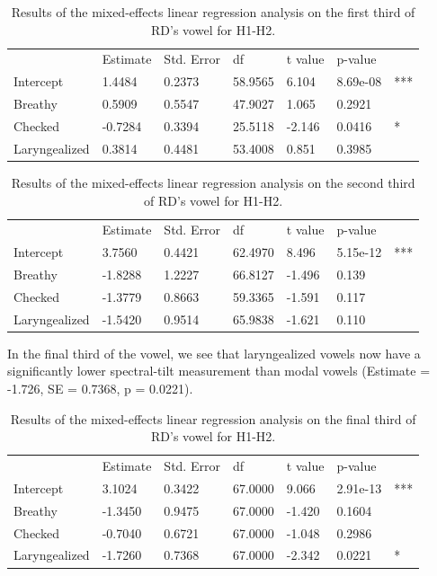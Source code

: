 \documentclass[12pt, letterpaper]{article}
\providecommand{\lsptoprule}{\midrule\toprule}
\providecommand{\lspbottomrule}{\bottomrule\midrule}
\begin{document}
\begin{table}[!h]
    \centering
    \caption{Results of the mixed-effects linear regression analysis on the first third of RD's  vowel for H1-H2. }
    \label{tab:RD_H1H2_First}
    \begin{tabular}{lllllll}
	\lsptoprule
					&  Estimate  & Std. Error & df & t value & p-value & \\
        Intercept       &  1.4484 & 0.2373 & 58.9565 & 6.104 & 8.69e-08 & ***\\  
  	Breathy   		&  0.5909 & 0.5547 & 47.9027 & 1.065 & 0.2921 & \\
	Checked    		& -0.7284 & 0.3394 & 25.5118 & -2.146 & 0.0416 & * \\
	Laryngealized	&  0.3814 & 0.4481 & 53.4008 &  0.851 &  0.3985 & \\
        \lspbottomrule
    \end{tabular}
\end{table}

\begin{table}[!h]
    \centering
    \caption{Results of the mixed-effects linear regression analysis on the second third of RD's vowel for H1-H2. }
    \label{tab:RD_H1H2_Second}
    \begin{tabular}{lllllll}
	\lsptoprule
					&  Estimate  & Std. Error & df & t value & p-value & \\
        Intercept       &  3.7560  & 0.4421 & 62.4970 & 8.496 & 5.15e-12 & *** \\ 
  	Breathy   		&  -1.8288 & 1.2227 & 66.8127 & -1.496 & 0.139 &  \\
	Checked    		&  -1.3779 & 0.8663 & 59.3365 & -1.591 & 0.117  & \\
	Laryngealized	&  -1.5420 & 0.9514 & 65.9838 & -1.621 & 0.110 & \\
        \lspbottomrule
    \end{tabular}
\end{table}

In the final third of the vowel, we see that laryngealized vowels now have a significantly lower spectral-tilt measurement than modal vowels (Estimate = -1.726, SE = 0.7368, p = 0.0221).

\begin{table}[!h]
    \centering
    \caption{Results of the mixed-effects linear regression analysis on the final third of RD's vowel for H1-H2. }
    \label{tab:RD_H1H2_Third}
    \begin{tabular}{lllllll}
	\lsptoprule
					&  Estimate  & Std. Error & df & t value & p-value & \\
        Intercept       &  3.1024 & 0.3422 & 67.0000 & 9.066 & 2.91e-13 & *** \\  
  	Breathy   		& -1.3450 & 0.9475 & 67.0000 & -1.420 & 0.1604 &\\
	Checked    		& -0.7040 & 0.6721 & 67.0000 & -1.048 & 0.2986 & \\
	Laryngealized	& -1.7260 & 0.7368 & 67.0000 & -2.342 & 0.0221 & *\\
        \lspbottomrule
    \end{tabular}
\end{table}
\end{document}
